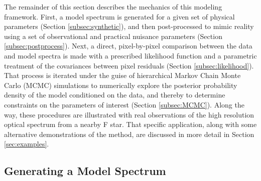 \documentclass[iop,floatfix]{emulateapj}
\begin{document}
The remainder of this section describes the mechanics of this modeling framework.  First, a model 
spectrum is generated for a given set of physical parameters (Section \ref{subsec:synthetic}), and 
then post-processed to mimic reality using a set of observational and practical nuisance parameters 
(Section \ref{subsec:postprocess}).  Next, a direct, pixel-by-pixel comparison between the data and 
model spectra is made with a prescribed likelihood function and a parametric treatment of the 
covariances between pixel residuals (Section \ref{subsec:likelihood}).  That process is iterated 
under the guise of hierarchical Markov Chain Monte Carlo (MCMC) simulations to numerically explore 
the posterior probability density of the model conditioned on the data, and thereby to determine 
constraints on the parameters of interest (Section \ref{subsec:MCMC}).  Along the way, these 
procedures are illustrated with real observations of the high resolution optical spectrum from a 
nearby F star.  That specific application, along with some alternative demonstrations of the 
method, are discussed in more detail in Section \ref{sec:examples}.


\subsection{Generating a Model Spectrum \label{subsec:synthetic}}
\end{document}
